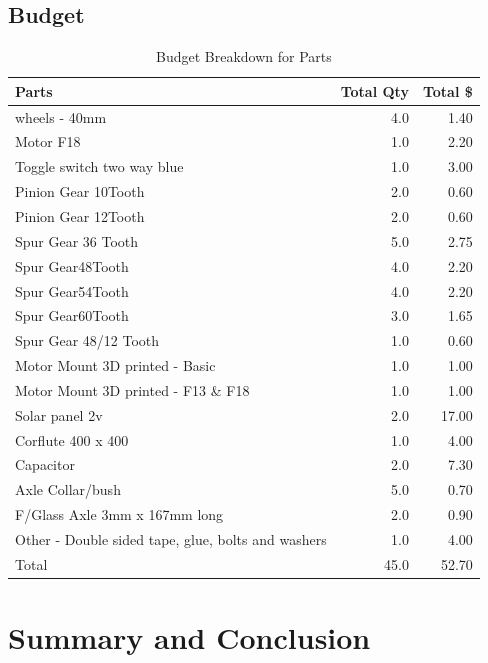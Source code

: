 \documentclass[12pt]{article}
\begin{document}
\subsection{Budget}
\begin{table}[h] 
\centering 
\begin{tabularx}{\textwidth}{Xrr}
\toprule
Parts & Total Qty & Total \$ \\
\midrule
wheels - 40mm & 4.0 & 1.40 \\
Motor F18 & 1.0 & 2.20 \\
Toggle switch two way blue & 1.0 & 3.00 \\
Pinion Gear 10Tooth & 2.0 & 0.60 \\
Pinion Gear 12Tooth & 2.0 & 0.60 \\
Spur Gear 36 Tooth & 5.0 & 2.75 \\
Spur Gear48Tooth & 4.0 & 2.20 \\
Spur Gear54Tooth & 4.0 & 2.20 \\
Spur Gear60Tooth & 3.0 & 1.65 \\
Spur Gear 48/12 Tooth & 1.0 & 0.60 \\
Motor Mount 3D printed - Basic & 1.0 & 1.00 \\
Motor Mount 3D printed - F13 \& F18 & 1.0 & 1.00 \\
Solar panel 2v & 2.0 & 17.00 \\
Corflute 400 x 400 & 1.0 & 4.00 \\
Capacitor & 2.0 & 7.30 \\
Axle Collar/bush & 5.0 & 0.70 \\
F/Glass Axle 3mm x 167mm long & 2.0 & 0.90 \\
Other - Double sided tape, glue, bolts and washers & 1.0 & 4.00 \\
\midrule
Total & 45.0 & 52.70 \\
\bottomrule
\end{tabularx}
\caption{Budget Breakdown for Parts}  %
\end{table}
\section{Summary and Conclusion}

\printbibliography
\end{document}
